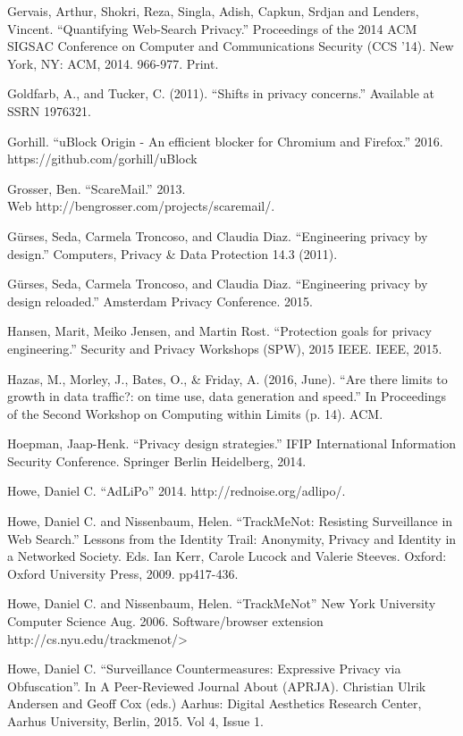 \documentclass[conference]{IEEEtran}
\begin{document}
\begin{thebibliography}{99}
 Gervais, Arthur, Shokri, Reza, Singla, Adish, Capkun, Srdjan and Lenders, Vincent. “Quantifying Web-Search Privacy.” Proceedings of the 2014 ACM SIGSAC Conference on Computer and Communications Security (CCS '14). New York, NY: ACM, 2014. 966-977. Print.

 Goldfarb, A., and Tucker, C. (2011). “Shifts in privacy concerns.” Available at SSRN 1976321.

 Gorhill. “uBlock Origin - An efficient blocker for Chromium and Firefox.” 2016. https://github.com/gorhill/uBlock

 Grosser, Ben. “ScareMail.” 2013.\\ Web http://bengrosser.com/projects/scaremail/.

 G\"urses, Seda, Carmela Troncoso, and Claudia Diaz. “Engineering privacy by design.” Computers, Privacy \& Data Protection 14.3 (2011).

 G\"urses, Seda, Carmela Troncoso, and Claudia Diaz. “Engineering privacy by design reloaded.” Amsterdam Privacy Conference. 2015.

 Hansen, Marit, Meiko Jensen, and Martin Rost. “Protection goals for privacy engineering.” Security and Privacy Workshops (SPW), 2015 IEEE. IEEE, 2015.

 Hazas, M., Morley, J., Bates, O., \& Friday, A. (2016, June). “Are there limits to growth in data traffic?: on time use, data generation and speed.” In Proceedings of the Second Workshop on Computing within Limits (p. 14). ACM.

 Hoepman, Jaap-Henk. “Privacy design strategies.” IFIP International Information Security Conference. Springer Berlin Heidelberg, 2014.

 Howe, Daniel C. “AdLiPo” 2014. http://rednoise.org/adlipo/.

 Howe, Daniel C. and Nissenbaum, Helen. “TrackMeNot: Resisting Surveillance in Web Search.” Lessons from the Identity Trail: Anonymity, Privacy and Identity in a Networked Society. Eds. Ian Kerr, Carole Lucock and Valerie Steeves. Oxford: Oxford University Press, 2009. pp417-436.

 Howe, Daniel C. and Nissenbaum, Helen. “TrackMeNot” New York University Computer Science Aug. 2006. Software/browser extension http://cs.nyu.edu/trackmenot/>

 Howe, Daniel C. “Surveillance Countermeasures: Expressive Privacy via Obfuscation”. In A Peer-Reviewed Journal About (APRJA). Christian Ulrik Andersen and Geoff Cox (eds.) Aarhus: Digital Aesthetics Research Center, Aarhus University, Berlin, 2015. Vol 4, Issue 1.


\end{thebibliography}
\end{document}
